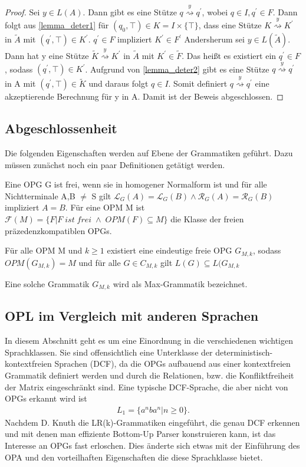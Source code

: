 \begin{proof}
Sei $y \in L(A)$. Dann gibt es eine Stütze $q \stackrel{y} {\rightsquigarrow} q^\prime$, wobei $q\in I, q^\prime \in F$. Dann folgt aus \autoref{lemma_deter1} für $(q_0, \top) \in K=I \times \{\top\}$, dass eine Stütze $K \stackrel{y}{\rightsquigarrow}K^\prime$ in $\tilde{A}$ mit $(q^\prime, \top) \in K^\prime $. $q^\prime \in F$ impliziert $K^\prime \in F^\prime$
Andersherum sei $y \in L(\tilde{A})$. Dann hat y eine Stütze $\tilde{K}\stackrel{y}{\rightsquigarrow}K^\prime$ in $\tilde{A}$ mit $K^\prime \in \tilde{F}$. Das heißt es existiert ein $q^\prime \in F$, sodass $(q^\prime, \top) \in K^\prime$. Aufgrund von \autoref{lemma_deter2} gibt es eine Stütze $q \stackrel{y} {\rightsquigarrow} q^\prime$ in A mit $(q^\prime, \top) \in \tilde{K}$ und daraus folgt $q \in I$. Somit definiert $q\stackrel{y}{\rightsquigarrow}q^\prime$ eine akzeptierende Berechnung für y in A.
Damit ist der Beweis abgeschlossen. 
\end{proof}
\subsection{Abgeschlossenheit}
Die folgenden Eigenschaften werden auf Ebene der Grammatiken geführt. Dazu müssen zunächst noch ein paar Definitionen getätigt werden. \cite{algebraic_properties}
\begin{definition}
Eine OPG G ist frei, wenn sie in homogener Normalform ist und für alle Nichtterminale A,B $\neq$ S gilt $\mathcal{L}_G(A) = \mathcal{L}_G(B) \wedge \mathcal{R}_G(A)=\mathcal{R}_G(B)$ impliziert $A=B$. Für eine OPM M ist $\mathcal{F}(M)=\{F|F \; ist \; frei \; \wedge \; OPM(F) \subseteq M\}$ die Klasse der freien präzedenzkompatiblen OPGs.
\end{definition}

\begin{lemma}
Für alle OPM M und $k \geq 1$ existiert eine eindeutige freie OPG $G_{M,k}$, sodass $OPM(G_{M,k})=M$ und für alle $G \in C_{M,k}$ gilt $L(G)\subseteq L(G_{M,k}$
\end{lemma}
Eine solche Grammatik $G_{M,k}$ wird als Max-Grammatik bezeichnet.

\subsection{OPL im Vergleich mit anderen Sprachen}
In diesem Abschnitt geht es um eine Einordnung in die verschiedenen wichtigen Sprachklassen. Sie sind offensichtlich eine Unterklasse der deterministisch-kontextfreien Sprachen (DCF), da die OPGs aufbauend aus einer kontextfreien Grammatik definiert werden und durch die Relationen, bzw. die Konfliktfreiheit der Matrix eingeschränkt sind. Eine typische DCF-Sprache, die aber nicht von OPGs erkannt wird ist
\begin{align*}
L_1=\{a^nba^n|n \geq 0 \}.
\end{align*}
Nachdem D. Knuth die LR(k)-Grammatiken eingeführt, die genau DCF erkennen und mit denen man effiziente Bottom-Up Parser konstruieren kann, ist das Interesse an OPGs fast erloschen. Dies änderte sich etwas mit der Einführung des OPA und den vorteilhaften Eigenschaften die diese Sprachklasse bietet.

